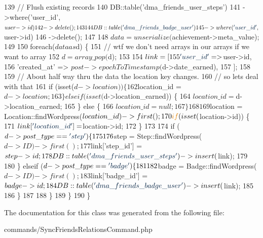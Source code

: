 \begin{DoxyCode}
139             \textcolor{comment}{// Flush existing records}
140             DB::table(\textcolor{stringliteral}{'dma\_friends\_user\_steps'})
141                 ->where(\textcolor{stringliteral}{'user\_id'}, $user->id)
142                 ->delete();
143 
144             DB::table(\textcolor{stringliteral}{'dma\_friends\_badge\_user'})
145                 ->where(\textcolor{stringliteral}{'user\_id'}, $user->id)
146                 ->delete();
147 
148             $data = unserialize($achievement->meta\_value);
149 
150             \textcolor{keywordflow}{foreach}($data as $d) \{
151                 \textcolor{comment}{// wtf we don't need arrays in our arrays if we want to array}
152                 $d = array\_pop($d);
153 
154                 $link = [
155                     \textcolor{stringliteral}{'user\_id'}       => $user->id,
156                     \textcolor{stringliteral}{'created\_at'}    => $post->epochToTimestamp($d->date\_earned),
157                 ];
158 
159                 \textcolor{comment}{// About half way thru the data the location key changes.}
160                 \textcolor{comment}{// so lets deal with that}
161                 \textcolor{keywordflow}{if} (isset($d->location)) \{
162                     $location\_id = $d->location;
163                 \} elseif (isset($d->location\_earned)) \{
164                     $location\_id = $d->location\_earned;
165                 \} \textcolor{keywordflow}{else} \{
166                     $location\_id = null;
167                 \}
168 
169                 $location = Location::findWordpress($location\_id)->first();
170                 \textcolor{keywordflow}{if} (isset($location->id)) \{
171                     $link[\textcolor{stringliteral}{'location\_id'}] = $location->id;
172                 \}
173 
174                 \textcolor{keywordflow}{if} ($d->post\_type == \textcolor{stringliteral}{'step'}) \{
175 
176                     $step = Step::findWordpress($d->ID)->first();
177                     $link[\textcolor{stringliteral}{'step\_id'}] = $step->id;
178                     DB::table(\textcolor{stringliteral}{'dma\_friends\_user\_steps'})->insert($link);
179 
180                 \} elseif ($d->post\_type == \textcolor{stringliteral}{'badge'}) \{
181 
182                     $badge = Badge::findWordpress($d->ID)->first();
183                     $link[\textcolor{stringliteral}{'badge\_id'}] = $badge->id;
184                     DB::table(\textcolor{stringliteral}{'dma\_friends\_badge\_user'})->insert($link);
185 
186                 \}
187         
188             \}
189         \}
190     \}
\end{DoxyCode}


The documentation for this class was generated from the following file\+:\begin{DoxyCompactItemize}
\item 
commands/Sync\+Friends\+Relations\+Command.\+php\end{DoxyCompactItemize}
